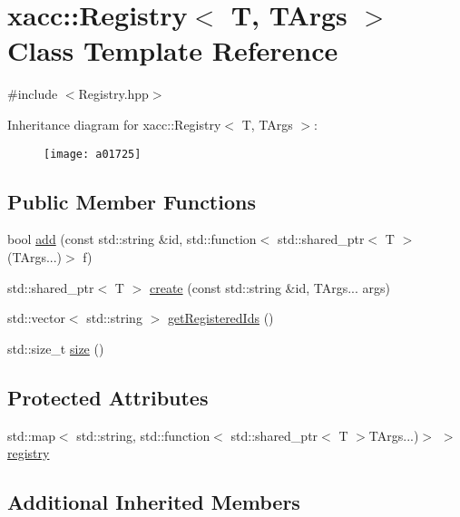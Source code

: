 \hypertarget{a01725}{}\section{xacc\+:\+:Registry$<$ T, T\+Args $>$ Class Template Reference}
\label{a01725}


{\ttfamily \#include $<$Registry.\+hpp$>$}

Inheritance diagram for xacc\+:\+:Registry$<$ T, T\+Args $>$\+:\begin{figure}[H]
\begin{center}
\leavevmode
\texttt{[image: a01725]}
\end{center}
\end{figure}
\subsection*{Public Member Functions}
\begin{DoxyCompactItemize}
\item 
bool \hyperlink{a01725_a9aa172c2603171db067b40bd62ba53c6}{add} (const std\+::string \&id, std\+::function$<$ std\+::shared\+\_\+ptr$<$ T $>$(T\+Args...)$>$ f)
\item 
std\+::shared\+\_\+ptr$<$ T $>$ \hyperlink{a01725_a3e71cc8d0effd065252608ee1ccdf207}{create} (const std\+::string \&id, T\+Args... args)
\item 
std\+::vector$<$ std\+::string $>$ \hyperlink{a01725_a8bff6f5c50534375abc4026662d69d2e}{get\+Registered\+Ids} ()
\item 
std\+::size\+\_\+t \hyperlink{a01725_a2352dd7c6c85ae5c5e232b577dfa2544}{size} ()
\end{DoxyCompactItemize}
\subsection*{Protected Attributes}
\begin{DoxyCompactItemize}
\item 
std\+::map$<$ std\+::string, std\+::function$<$ std\+::shared\+\_\+ptr$<$ T $>$T\+Args...)$>$ $>$ \hyperlink{a01725_a46460ecacc7facb6936b3c1ec6d618d7}{registry}
\end{DoxyCompactItemize}
\subsection*{Additional Inherited Members}


